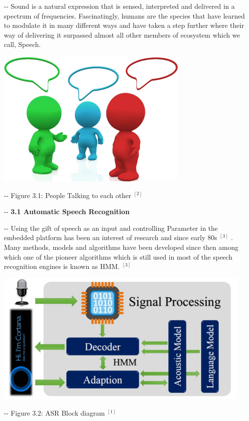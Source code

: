 \documentclass[12pt]{article}
\makeatletter
\newenvironment{indentation}[3]%
	{\par\setlength{\parindent}{#3}
	\setlength{\leftmargin}{#1}       \setlength{\rightmargin}{#2}%
	\advance\linewidth -\leftmargin       \advance\linewidth -\rightmargin%
	\advance\@totalleftmargin\leftmargin  \@setpar{{\@@par}}%
	\parshape 1\@totalleftmargin \linewidth\ignorespaces}{\par}%
\makeatother
\begin{document}
\begin{indentation}{0pt}{0pt}{0pt}
Sound is a natural expression that is sensed, interpreted and delivered in a
spectrum of frequencies. Fascinatingly, humans are the species that have learned
to modulate it in many different ways and have taken a step further where their
way of delivering it surpassed almost all other members of ecosystem which we
call, Speech.
\end{indentation}
\includegraphics[width=267pt]{img-1.png}
\begin{center}
\begin{indentation}{0pt}{0pt}{0pt}
{Figure 3.1: People Talking to each other}
$^{[2]}$

\end{indentation}
\end{center}

\begin{indentation}{0pt}{0pt}{0pt}
\textbf{{\large 3.1 Automatic Speech Recognition}}
\end{indentation}

\begin{indentation}{0pt}{0pt}{0pt}
{Using the gift of speech as an input and controlling Parameter in the embedded platform has been an interest of research and since early 80s}
$^{[3]}$
{. Many methods, models and algorithms have been developed since then among which
one of the pioneer algorithms which is still used in most of the speech
recognition engines is known as HMM.}
$^{[3]}$
\end{indentation}
\includegraphics[width=358pt]{img-2.png}\textbf{{\large  }}
\begin{center}
\begin{indentation}{0pt}{0pt}{0pt}
{Figure 3.2: ASR Block diagram}
$^{[1]}$

\end{indentation}
\end{center}
\end{document}
